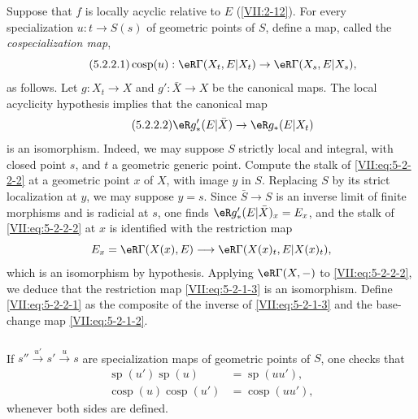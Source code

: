 \documentclass[12pt,oneside,english]{smfbook}
\DeclareMathOperator{\cosp}{cosp}
\DeclareMathOperator{\spe}{sp} %
\begin{document}
\subsubsection{}\label{VII:5-2-2}

Suppose that $f$ is locally acyclic relative to $E$ (\ref{VII:2-12}). For every specialization $u:t\to S(s)$ of geometric points of $S$, define a map, called the \emph{cospecialization map},
\begin{equation*}\tag{5.2.2.1}\label{VII:eq:5-2-2-1}
  \cosp(u):\eR\Gamma(X_t,E|X_t) \to \eR\Gamma(X_s,E|X_s) \text{,}
\end{equation*}
as follows. Let $g:X_t\to X$ and $g':\bar X\to X$ be the canonical maps. The local acyclicity hypothesis implies that the canonical map
\begin{equation*}\tag{5.2.2.2}\label{VII:eq:5-2-2-2}
  \eR g_\ast'(E|\bar X)\to \eR g_\ast(E|X_t)
\end{equation*}
is an isomorphism. Indeed, we may suppose $S$ strictly local and integral, with closed point $s$, and $t$ a geometric generic point. Compute the stalk of \eqref{VII:eq:5-2-2-2} at a geometric point $x$ of $X$, with image $y$ in $S$. Replacing $S$ by its strict localization at $y$, we may suppose $y=s$. Since $\bar S\to S$ is an inverse limit of finite morphisms and is radicial at $s$, one finds $\eR g'_\ast(E|\bar X)_x=E_x$, and the stalk of \eqref{VII:eq:5-2-2-2} at $x$ is identified with the restriction map
\[
  E_x=\eR\Gamma(X(x),E)\longrightarrow
  \eR\Gamma(X(x)_t,E|X(x)_t),
\]
which is an isomorphism by hypothesis. Applying $\eR\Gamma(X,-)$ to \eqref{VII:eq:5-2-2-2}, we deduce that the restriction map \eqref{VII:eq:5-2-1-3} is an isomorphism. Define \eqref{VII:eq:5-2-2-1} as the composite of the inverse of \eqref{VII:eq:5-2-1-3} and the base-change map \eqref{VII:eq:5-2-1-2}.

\subsubsection{}\label{VII:5-2-3}

If $s'' \xrightarrow{u'} s' \xrightarrow u s$ are specialization maps of geometric points of $S$, one checks that
\begin{align*}
  \spe(u')\spe(u) &= \spe(u u'), \\
  \cosp(u) \cosp(u') &= \cosp(u u'),
\end{align*}
whenever both sides are defined.

\subsubsection{}\label{VII:5-2-4}
\end{document}
